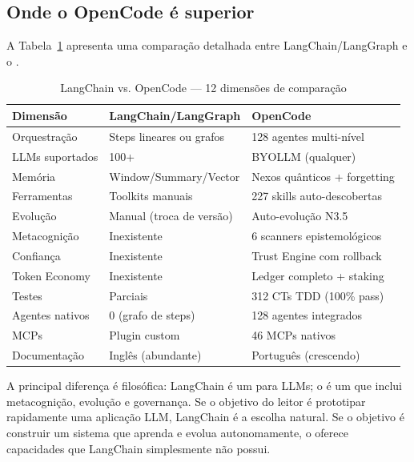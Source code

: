\subsection{Onde o OpenCode é superior}
A Tabela~\ref{tab:comparacao-langchain} apresenta uma comparação
detalhada entre LangChain/LangGraph e o \opencodeeco{}.
\begin{table}[htb]
\centering
\caption{LangChain vs. OpenCode --- 12 dimensões de comparação}
\label{tab:comparacao-langchain}
\begin{tabular}{lll}
\toprule
\textbf{Dimensão} & \textbf{LangChain/LangGraph} & \textbf{OpenCode} \\
\midrule
Orquestração & Steps lineares ou grafos & 128 agentes multi-nível \\
LLMs suportados & 100+ & BYOLLM (qualquer) \\
Memória & Window/Summary/Vector & Nexos quânticos + forgetting \\
Ferramentas & Toolkits manuais & 227 skills auto-descobertas \\
Evolução & Manual (troca de versão) & Auto-evolução N3.5 \\
Metacognição & Inexistente & 6 scanners epistemológicos \\
Confiança & Inexistente & Trust Engine com rollback \\
Token Economy & Inexistente & Ledger completo + staking \\
Testes & Parciais & 312 CTs TDD (100\% pass) \\
Agentes nativos & 0 (grafo de steps) & 128 agentes integrados \\
MCPs & Plugin custom & 46 MCPs nativos \\
Documentação & Inglês (abundante) & Português (crescendo) \\
\bottomrule
\end{tabular}
\end{table}
\noindent A principal diferença é filosófica: LangChain é um
 para LLMs; o \opencodeeco{} é um
 que inclui metacognição, evolução e
governança. Se o objetivo do leitor é prototipar rapidamente uma aplicação
LLM, LangChain é a escolha natural. Se o objetivo é construir um sistema
que aprenda e evolua autonomamente, o \opencodeeco{} oferece capacidades
que LangChain simplesmente não possui.

